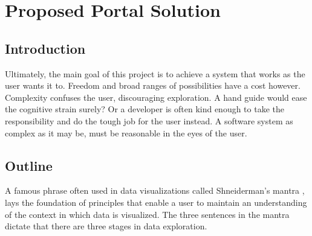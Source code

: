 \graphicspath{{Chapter5/Figs/Vector/}{Chapter5/Figs/}}

%
\chapter{Proposed Portal Solution}

%
\section{Introduction}
Ultimately, the main goal of this project is to achieve a system that works as the user wants it to. Freedom and broad ranges of possibilities have a cost however. Complexity confuses the user, discouraging exploration. A hand guide would ease the cognitive strain surely? Or a developer is often kind enough to take the responsibility and do the tough job for the user instead. A software system as complex as it may be, must be reasonable in the eyes of the user.



%
%
\section{Outline}
A famous phrase often used in data visualizations called Shneiderman's mantra \cite{mantra}, lays the foundation of principles that enable a user to maintain an understanding of the context in which data is visualized. The three sentences in the mantra dictate that there are three stages in data exploration.

